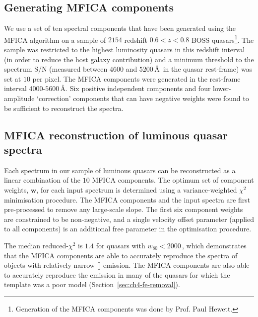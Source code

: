 \subsection{Generating MFICA components}

We use a set of ten spectral components that have been generated using the MFICA algorithm on a sample of $2154$ redshift $0.6 < z < 0.8$ BOSS quasars\footnote{Generation of the MFICA components was done by Prof. Paul Hewett.}.
The sample was restricted to the highest luminosity quasars in this redshift interval (in order to reduce the host galaxy contribution) and a minimum threshold to the spectrum S/N (measured between $4600$ and $5200$\,\AA\, in the quasar rest-frame) was set at $10$ per pixel.
The MFICA components were generated in the rest-frame interval $4000$-$5600$\,\AA.
Six positive independent components and four lower-amplitude `correction' components that can have negative weights were found to be sufficient to reconstruct the spectra.

\subsection{MFICA reconstruction of luminous quasar spectra}

Each spectrum in our sample of luminous quasars can be reconstructed as a linear combination of the $10$ MFICA components.
The optimum set of component weights, $\mathbf{w}$, for each input spectrum is determined using a variance-weighted $\chi^2$ minimisation procedure.
The MFICA components and the input spectra are first pre-processed to remove any large-scale slope.
The first six component weights are constrained to be non-negative, and a single velocity offset parameter (applied to all components) is an additional free parameter in the optimisation procedure.

The median reduced-$\chi^2$ is $1.4$ for quasars with $w_{80} < 2000$\,\kms, which demonstrates that the MFICA components are able to accurately reproduce the spectra of objects with relatively narrow [] emission.
The MFICA components are also able to accurately reproduce the  emission in many of the quasars for which the \citet{boroson92} template was a poor model (Section~\ref{sec:ch4-fe-removal}).

